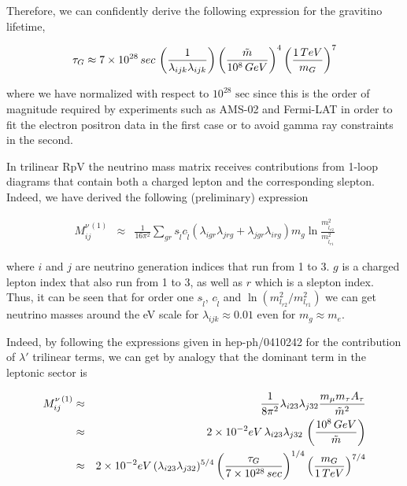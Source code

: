 \documentclass[a4paper,11pt]{article}
\begin{document}
Therefore, we can confidently derive the following expression for
the gravitino lifetime,

\begin{equation}
\tau_{G}\approx7\times10^{28}\,\mbox{sec}\,\left(\frac{1}{\lambda_{ijk}\lambda_{ijk}}\right)\left(\frac{\tilde{m}}{10^{8}\mbox{\,GeV}}\right)^{4}\left(\frac{1\,\mbox{TeV}}{m_{G}}\right)^{7}\label{eq:GravLifeTime}
\end{equation}


\noindent where we have normalized with respect to $10^{28}\mbox{ sec}$
since this is the order of magnitude required by experiments such
as AMS-02 and Fermi-LAT in order to fit the electron positron data
in the first case or to avoid gamma ray constraints in the second.



In trilinear RpV the neutrino mass matrix receives contributions from
1-loop diagrams that contain both a charged lepton and the corresponding
slepton. Indeed, we have derived the following (preliminary) expression

\begin{eqnarray*}
M_{ij}^{\nu\,(1)} & \approx & \frac{1}{16\pi^{2}}\sum_{gr}s_{\tilde{l}}c_{\tilde{l}}(\lambda_{igr}\lambda_{jrg}+\lambda_{jgr}\lambda_{irg})m_{g}\ln\frac{m_{\tilde{l}_{r2}}^{2}}{m_{\tilde{l}_{r1}}^{2}}
\end{eqnarray*}


\noindent where $i$ and $j$ are neutrino generation indices that
run from 1 to 3. $g$ is a charged lepton index that also run from
1 to 3, as well as $r$ which is a slepton index. Thus, it can be
seen that for order one $s_{\tilde{l}}$, $c_{\tilde{l}}$ and $\ln(m_{l_{r2}}^{2}/m_{l_{r1}}^{2})$
we can get neutrino masses around the eV scale for $\lambda_{ijk}\approx0.01$
even for $m_{g}\approx m_{e}$. 

Indeed, by following the expressions given in hep-ph/0410242 for the
contribution of $\lambda'$ trilinear terms, we can get by analogy
that the dominant term in the leptonic sector is 

\begin{eqnarray*}
M_{ij}^{\nu\,(1)} & \approx & \frac{1}{8\pi^{2}}\lambda_{i23}\lambda_{j32}\frac{m_{\mu}m_{\tau}A_{\tau}}{\tilde{m}^{2}}\\
 & \approx & 2\times10^{-2}\mbox{eV}\,\lambda_{i23}\lambda_{j32}\,\left(\frac{10^{8}\mbox{\,GeV}}{\tilde{m}}\right)\\
 & \approx & 2\times10^{-2}\mbox{eV}\,(\lambda_{i23}\lambda_{j32})^{5/4}\left(\frac{\tau_{G}}{7\times10^{\text{28}}\,\mbox{sec}}\right)^{1/4}\left(\frac{m_{G}}{1\,\mbox{TeV}}\right)^{7/4}
\end{eqnarray*}
\end{document}
